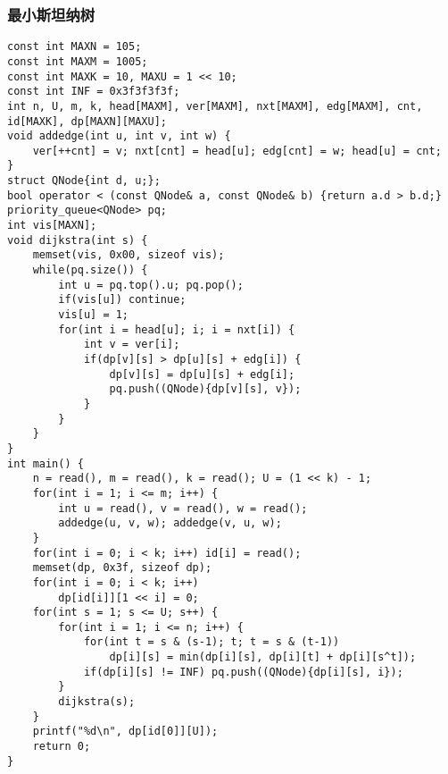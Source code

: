 \documentclass{article}
\begin{document}
   \subsubsection{最小斯坦纳树}
   \begin{lstlisting}
const int MAXN = 105;
const int MAXM = 1005;
const int MAXK = 10, MAXU = 1 << 10;
const int INF = 0x3f3f3f3f;
int n, U, m, k, head[MAXM], ver[MAXM], nxt[MAXM], edg[MAXM], cnt, id[MAXK], dp[MAXN][MAXU];
void addedge(int u, int v, int w) {
	ver[++cnt] = v; nxt[cnt] = head[u]; edg[cnt] = w; head[u] = cnt;
}
struct QNode{int d, u;};
bool operator < (const QNode& a, const QNode& b) {return a.d > b.d;}
priority_queue<QNode> pq;
int vis[MAXN];
void dijkstra(int s) {
	memset(vis, 0x00, sizeof vis);
	while(pq.size()) {
		int u = pq.top().u; pq.pop();
		if(vis[u]) continue;
		vis[u] = 1;
		for(int i = head[u]; i; i = nxt[i]) {
			int v = ver[i];
			if(dp[v][s] > dp[u][s] + edg[i]) {
				dp[v][s] = dp[u][s] + edg[i];
				pq.push((QNode){dp[v][s], v});
			}
		}
	}
}
int main() {
	n = read(), m = read(), k = read(); U = (1 << k) - 1;
	for(int i = 1; i <= m; i++) {
		int u = read(), v = read(), w = read();
		addedge(u, v, w); addedge(v, u, w);
	}
	for(int i = 0; i < k; i++) id[i] = read();
	memset(dp, 0x3f, sizeof dp);
	for(int i = 0; i < k; i++)
		dp[id[i]][1 << i] = 0;
	for(int s = 1; s <= U; s++) {
		for(int i = 1; i <= n; i++) {
			for(int t = s & (s-1); t; t = s & (t-1))
				dp[i][s] = min(dp[i][s], dp[i][t] + dp[i][s^t]);
			if(dp[i][s] != INF) pq.push((QNode){dp[i][s], i});
		}
		dijkstra(s);
	}
	printf("%d\n", dp[id[0]][U]);
	return 0;
}
   \end{lstlisting}
\end{document}

